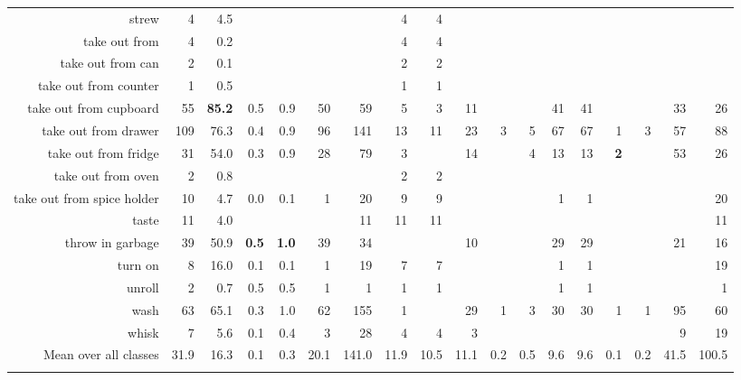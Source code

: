 \begin{tabular}{r r r r@{\ \ }r@{\ \ }r@{\ \ }r@{\ \ }r r@{\ \ }r@{\ \ }r@{\ \ }r@{\ \ }r@{\ \ }r@{\ \ }r@{\ \ }r@{\ \ }r@{\ \ }r}
strew & 4 & 4.5 &  &  &  &  & 4 & 4 &  &  &  &  &  &  &  &  &  \\
take out from  & 4 & 0.2 &  &  &  &  & 4 & 4 &  &  &  &  &  &  &  &  &  \\
take out from can & 2 & 0.1 &  &  &  &  & 2 & 2 &  &  &  &  &  &  &  &  &  \\
take out from counter & 1 & 0.5 &  &  &  &  & 1 & 1 &  &  &  &  &  &  &  &  &  \\
take out from cupboard & 55 & \textbf{85.2} & 0.5 & 0.9 & 50 & 59 & 5 & 3 & 11 &  &  & 41 & 41 &  &  & 33 & 26 \\
take out from drawer & 109 & 76.3 & 0.4 & 0.9 & 96 & 141 & 13 & 11 & 23 & 3 & 5 & 67 & 67 & 1 & 3 & 57 & 88 \\
take out from fridge & 31 & 54.0 & 0.3 & 0.9 & 28 & 79 & 3 &  & 14 &  & 4 & 13 & 13 & \textbf{2} &  & 53 & 26 \\
take out from oven & 2 & 0.8 &  &  &  &  & 2 & 2 &  &  &  &  &  &  &  &  &  \\
take out from spice holder & 10 & 4.7 & 0.0 & 0.1 & 1 & 20 & 9 & 9 &  &  &  & 1 & 1 &  &  &  & 20 \\
taste & 11 & 4.0 &  &  &  & 11 & 11 & 11 &  &  &  &  &  &  &  &  & 11 \\
throw in garbage & 39 & 50.9 & \textbf{0.5} & \textbf{1.0} & 39 & 34 &  &  & 10 &  &  & 29 & 29 &  &  & 21 & 16 \\
turn on & 8 & 16.0 & 0.1 & 0.1 & 1 & 19 & 7 & 7 &  &  &  & 1 & 1 &  &  &  & 19 \\
unroll & 2 & 0.7 & 0.5 & 0.5 & 1 & 1 & 1 & 1 &  &  &  & 1 & 1 &  &  &  & 1 \\
wash & 63 & 65.1 & 0.3 & 1.0 & 62 & 155 & 1 &  & 29 & 1 & 3 & 30 & 30 & 1 & 1 & 95 & 60 \\
whisk & 7 & 5.6 & 0.1 & 0.4 & 3 & 28 & 4 & 4 & 3 &  &  &  &  &  &  & 9 & 19 \\
\cmidrule(lr){1-1} \cmidrule(lr){2-2} \cmidrule(lr){3-3} \cmidrule(lr){4-8} \cmidrule(lr){9-18}
Mean over all classes&31.9&16.3&0.1&0.3&20.1&141.0&11.9&10.5&11.1&0.2&0.5&9.6&9.6&0.1&0.2&41.5&100.5
\\ \bottomrule \\ \end{tabular}
